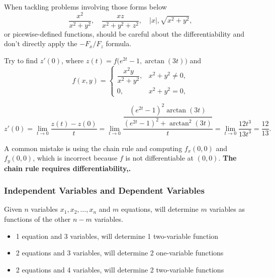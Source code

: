 \documentclass[a4]{overview}
\begin{document}
\begin{remark}
	When tackling problems involving those forms below
	\[
		\frac{x^2}{x^2+y^2},\quad
		\frac{xz}{x^2+y^2+z^2},\quad
		|x|,
		\sqrt{x^2+y^2},
	\] 
	or picewise-defined functions, should be careful about the differentiability
	and don't directly apply the $-F_x/F_z$ formula.
	
\end{remark}


\begin{example}
Try to find $z'(0)$, where $z(t)=f\bigl(e^{2t}-1,\arctan(3t)\bigr)$ and
\[
f(x,y)=
\begin{cases}
\dfrac{x^{2}y}{x^{2}+y^{2}}, & x^{2}+y^{2}\neq 0,\\[6pt]
0, & x^{2}+y^{2}=0,
\end{cases}
\]

\begin{answer}
	
\[
z'(0)
=\lim_{t\to0}\frac{z(t)-z(0)}{t}
=\lim_{t\to0}
\frac{
\dfrac{(e^{2t}-1)^2\arctan(3t)}
{(e^{2t}-1)^2+\arctan^2(3t)}
}{t}
=\lim_{t\to0}
\frac{12t^3}{13t^3}
=\frac{12}{13}.
\]
\end{answer}

\begin{remark}
A common mistake is using the chain rule and computing $f_x(0,0)$ and $f_y(0,0)$, which
is incorrect because $f$ is not differentiable at $(0,0)$.
\textbf{The chain rule requires differentiability,.}
\end{remark}
	
\end{example}

\subsubsection{Independent Variables and Dependent Variables}

Given $n$ variables $x_1, x_2, \ldots, x_n$ and $m$ equations,
will determine $m$ variables as functions of the other $n-m$ variables.

\begin{itemize}
	\item 1 equation and 3 variables, will determine 1 two-variable function
	\item 2 equations and 3 variables, will determine 2 one-variable functions
	\item 2 equations and 4 variables, will determine 2 two-variable functions
\end{itemize}
\end{document}
